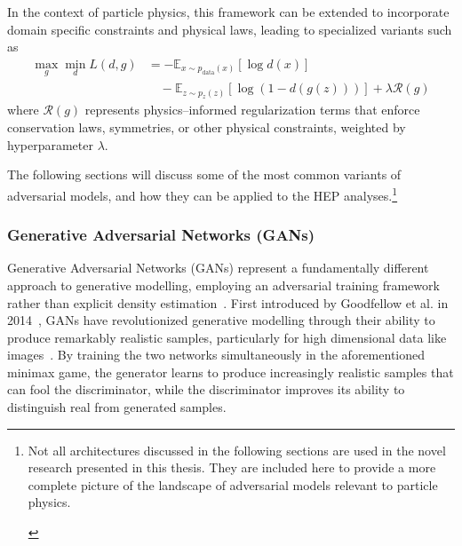         In the context of particle physics, this framework can be extended to incorporate domain specific constraints and physical laws, leading to specialized variants such as
        \begin{equation}
            \begin{split}
                \max_g \min_d L(d, g) &= -\mathbb{E}_{x \sim p_{\text{data}}(x)}[\log d(x)] \\
                &\quad - \mathbb{E}_{z \sim p_z(z)}[\log(1 - d(g(z)))] + \lambda \mathcal{R}(g)
            \end{split}
        \end{equation}
        where \(\mathcal{R}(g)\) represents physics--informed regularization terms that enforce conservation laws, symmetries, or other physical constraints, weighted by hyperparameter \(\lambda\).

        The following sections will discuss some of the most common variants of adversarial models, and how they can be applied to the HEP analyses.\footnote{\begin{note}{Not all architectures discussed in the following sections are used in the novel research presented in this thesis. They are included here to provide a more complete picture of the landscape of adversarial models relevant to particle physics. }\end{note}}
    
    \subsubsection{Generative Adversarial Networks (GANs)}
    \label{subsubsec:GANs}
        Generative Adversarial Networks (GANs) represent a fundamentally different approach to generative modelling, employing an adversarial training framework rather than explicit density estimation~\cite{UCLDeepMind}.
        First introduced by Goodfellow et al. in 2014~\cite{Goodfellow2014GenerativeNetworks}, GANs have revolutionized generative modelling through their ability to produce remarkably realistic samples, particularly for high dimensional data like images~\cite{brock_large_2019, karras_analyzing_2020, karras_progressive_2018, zhang_self-attention_2019, karras_style-based_2019, denton_deep_2015}.
        By training the two networks simultaneously in the aforementioned minimax game, the generator learns to produce increasingly realistic samples that can fool the discriminator, while the discriminator improves its ability to distinguish real from generated samples.
    
